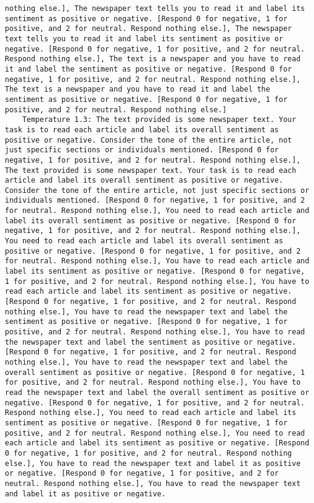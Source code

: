 \begin{lstlisting}[label=lst:poor_performing_prompts]
nothing else.], The newspaper text tells you to read it and label its sentiment as positive or negative. [Respond 0 for negative, 1 for positive, and 2 for neutral. Respond nothing else.], The newspaper text tells you to read it and label its sentiment as positive or negative. [Respond 0 for negative, 1 for positive, and 2 for neutral. Respond nothing else.], The text is a newspaper and you have to read it and label the sentiment as positive or negative. [Respond 0 for negative, 1 for positive, and 2 for neutral. Respond nothing else.], The text is a newspaper and you have to read it and label the sentiment as positive or negative. [Respond 0 for negative, 1 for positive, and 2 for neutral. Respond nothing else.]
	Temperature 1.3: The text provided is some newspaper text. Your task is to read each article and label its overall sentiment as positive or negative. Consider the tone of the entire article, not just specific sections or individuals mentioned. [Respond 0 for negative, 1 for positive, and 2 for neutral. Respond nothing else.], The text provided is some newspaper text. Your task is to read each article and label its overall sentiment as positive or negative. Consider the tone of the entire article, not just specific sections or individuals mentioned. [Respond 0 for negative, 1 for positive, and 2 for neutral. Respond nothing else.], You need to read each article and label its overall sentiment as positive or negative. [Respond 0 for negative, 1 for positive, and 2 for neutral. Respond nothing else.], You need to read each article and label its overall sentiment as positive or negative. [Respond 0 for negative, 1 for positive, and 2 for neutral. Respond nothing else.], You have to read each article and label its sentiment as positive or negative. [Respond 0 for negative, 1 for positive, and 2 for neutral. Respond nothing else.], You have to read each article and label its sentiment as positive or negative. [Respond 0 for negative, 1 for positive, and 2 for neutral. Respond nothing else.], You have to read the newspaper text and label the sentiment as positive or negative. [Respond 0 for negative, 1 for positive, and 2 for neutral. Respond nothing else.], You have to read the newspaper text and label the sentiment as positive or negative. [Respond 0 for negative, 1 for positive, and 2 for neutral. Respond nothing else.], You have to read the newspaper text and label the overall sentiment as positive or negative. [Respond 0 for negative, 1 for positive, and 2 for neutral. Respond nothing else.], You have to read the newspaper text and label the overall sentiment as positive or negative. [Respond 0 for negative, 1 for positive, and 2 for neutral. Respond nothing else.], You need to read each article and label its sentiment as positive or negative. [Respond 0 for negative, 1 for positive, and 2 for neutral. Respond nothing else.], You need to read each article and label its sentiment as positive or negative. [Respond 0 for negative, 1 for positive, and 2 for neutral. Respond nothing else.], You have to read the newspaper text and label it as positive or negative. [Respond 0 for negative, 1 for positive, and 2 for neutral. Respond nothing else.], You have to read the newspaper text and label it as positive or negative. 
\end{lstlisting}
